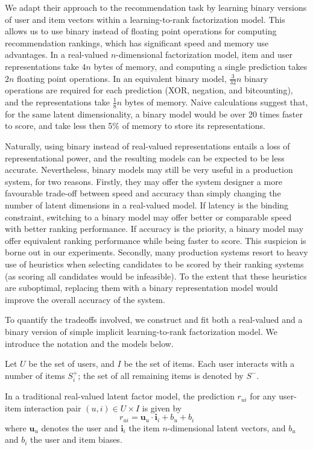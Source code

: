 \documentclass[sigchi]{acmart}
\newcommand\symUserSet{U}
\newcommand\symItemSet{I}
\newcommand\symUserInteractionSet{S}
\renewcommand\vec{\mathbf}
\begin{document}
We adapt their approach to the recommendation task by learning binary versions of user and item vectors within a learning-to-rank factorization model. This allows us to use binary instead of floating point operations for computing recommendation rankings, which has significant speed and memory use advantages. In a real-valued $n$-dimensional factorization model, item and user representations take $4n$ bytes of memory, and computing a single prediction takes $2n$ floating point operations. In an equivalent binary model, $\frac{3}{32}n$ binary operations are required for each prediction (XOR, negation, and bitcounting), and the representations take $\frac{1}{8}n$ bytes of memory. Naive calculations suggest that, for the same latent dimensionality, a binary model would be over 20 times faster to score, and take less then 5\% of memory to store its representations.

Naturally, using binary instead of real-valued representations entails a loss of representational power, and the resulting models can be expected to be less accurate. Nevertheless, binary models may still be very useful in a production system, for two reasons. Firstly, they may offer the system designer a more favourable trade-off between speed and accuracy than simply changing the number of latent dimensions in a real-valued model. If latency is the binding constraint, switching to a binary model may offer better or comparable speed with better ranking performance. If accuracy is the priority, a binary model may offer equivalent ranking performance while being faster to score. This suspicion is borne out in our experiments. Secondly, many production systems resort to heavy use of heuristics when selecting candidates to be scored by their ranking systems (as scoring all candidates would be infeasible). To the extent that these heuristics are suboptimal, replacing them with a binary representation model would improve the overall accuracy of the system.

To quantify the tradeoffs involved, we construct and fit both a real-valued and a binary version of simple implicit learning-to-rank factorization model. We introduce the notation and the models below.

Let $\symUserSet$ be the set of users, and $\symItemSet$ be the set of items. Each user interacts with a number of items $\symUserInteractionSet_i^+$; the set of all remaining items is denoted by $\symUserInteractionSet^-$.

In a traditional real-valued latent factor model, the prediction $r_{ui}$ for any user-item interaction pair $(u, i) \in \symUserSet \times \symItemSet$ is given by
\begin{equation}
r_{ui} = \vec{u}_u \cdot \vec{i}_i + b_u + b_i
\end{equation}
where $\vec{u}_u$ denotes the user and $\vec{i}_i$ the item $n$-dimensional latent vectors, and $b_u$ and $b_i$ the user and item biases.
\end{document}
